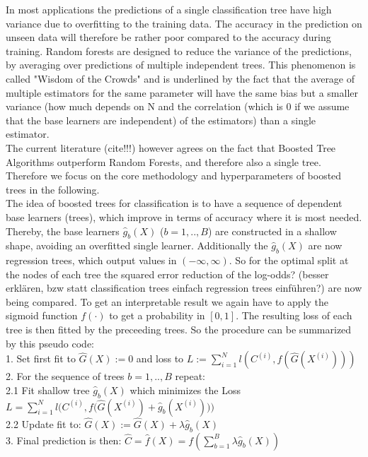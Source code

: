 \documentclass[12pt,titlepage]{article}
\begin{document}
In most applications the predictions of a single classification tree have high variance due to overfitting to the training data. The accuracy in the prediction on unseen data will therefore be rather poor compared to the accuracy during training. Random forests \cite{randomforest} are designed to reduce the variance of the predictions, by averaging over predictions of multiple independent trees. This phenomenon is called "Wisdom of the Crowds" and is underlined by the fact that the average of multiple estimators for the same parameter will have the same bias but a smaller variance (how much depends on N and the correlation (which is 0 if we assume that the base learners are independent) of the estimators) than a single estimator. \\
The current literature (cite!!!) however agrees on the fact that Boosted Tree Algorithms outperform Random Forests, and therefore also a single tree. Therefore we focus on the core methodology and hyperparameters of boosted trees in the following. \\
The idea of boosted trees for classification is to have a sequence of dependent base learners (trees), which improve in terms of accuracy where it is most needed. Thereby, the base learners $\hat{g}_{b}(X)$ ($b=1,..,B$) are constructed in a shallow shape, avoiding an overfitted single learner. Additionally the $\hat{g}_{b}(X)$ are now regression trees, which output values in $(-\infty, \infty)$. So for the optimal split at the nodes of each tree the squared error reduction of the log-odds? (besser erklären, bzw statt classification trees einfach regression trees einführen?) are now being compared. To get an interpretable result we again have to apply the sigmoid function $f(\cdot)$ to get a probability in $[0, 1]$. The resulting loss of each tree is then fitted by the preceeding trees. So the procedure can be summarized by this pseudo code: \\
1. Set first fit to $\hat{G}(X) := 0$ and loss to $L := \sum_{i=1}^{N} l(C^{(i)}, f(\hat{G}(X^{(i)})))$ \\
2. For the sequence of trees $b=1,..,B$ repeat: \\
2.1 Fit shallow tree $\hat{g}_{b}(X)$ which minimizes the Loss $L = \sum_{i=1}^{N} l\Big(C^{(i)}, f\big(\hat{G}(X^{(i)}) + \hat{g}_{b}(X^{(i)})\big)\Big)$ \\
2.2 Update fit to: $\hat{G}(X) := \hat{G}(X) + \lambda\hat{g}_{b}(X)$\\
3. Final prediction is then: $\hat{C} = \hat{f}(X) = f(\sum_{b=1}^{B}\lambda\hat{g}_{b}(X))$ \\
\end{document}
